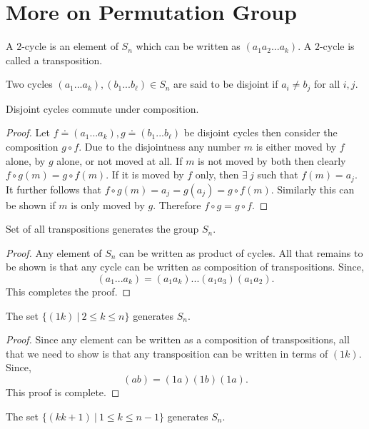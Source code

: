 \section{More on Permutation Group}
\begin{definition}
  A $2$-cycle is an element of $S_n$ which can be written as $(a_1a_2...a_k)$. A $2$-cycle is called a transposition.
\end{definition}
\begin{definition}
  Two cycles $(a_1...a_k), (b_1...b_\ell)\in S_n$ are said to be disjoint if $a_i \neq b_j$ for all $i,j$.
\end{definition}
\begin{proposition}
  Disjoint cycles commute under composition.
\end{proposition}
\begin{proof}
  Let $f \doteq (a_1...a_k), g\doteq (b_1...b_\ell)$ be disjoint cycles then consider the composition $g\circ f$. Due to the disjointness any number $m$ is either moved by $f$ alone, by $g$ alone, or not moved at all. If $m$ is not moved by both then clearly $f\circ g(m) = g\circ f(m)$. If it is moved by $f$ only, then $\exists\ j$ such that $f(m) = a_j$. It further follows that $f\circ g(m) = a_j = g(a_j) = g\circ f(m)$. Similarly this can be shown if $m$ is only moved by $g$. Therefore $f\circ g = g\circ f$.
\end{proof}
\begin{proposition}
  Set of all transpositions generates the group $S_n$.
\end{proposition}
\begin{proof}
  Any element of $S_n$ can be written as product of cycles. All that remains to be shown is that any cycle can be written as composition of transpositions. Since,
  \[(a_1...a_k) = (a_1a_k)...(a_1a_3)(a_1a_2).\]
  This completes the proof.
\end{proof}
\begin{proposition}
  The set $\{(1k)\ |\ 2\leq k\leq n\}$ generates $S_n$.
\end{proposition}
\begin{proof}
  Since any element can be written as a composition of transpositions, all that we need to show is that any transposition can be written in terms of $(1k)$. Since,
  \[(ab) = (1a)(1b)(1a).\]
  This proof is complete.
\end{proof}
\begin{proposition}
  The set $\{(kk+1)\ |\ 1\leq k\leq n-1\}$ generates $S_n$.
\end{proposition}
